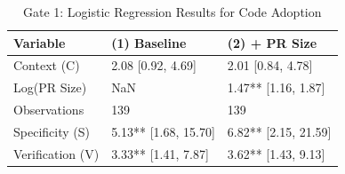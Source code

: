 \begin{table}
\caption{Gate 1: Logistic Regression Results for Code Adoption}
\label{tab:gate1}
\begin{tabular}{lll}
\toprule
Variable & (1) Baseline & (2) + PR Size \\
\midrule
Context (C) & 2.08 [0.92, 4.69] & 2.01 [0.84, 4.78] \\
Log(PR Size) & NaN & 1.47** [1.16, 1.87] \\
Observations & 139 & 139 \\
Specificity (S) & 5.13** [1.68, 15.70] & 6.82** [2.15, 21.59] \\
Verification (V) & 3.33** [1.41, 7.87] & 3.62** [1.43, 9.13] \\
\bottomrule
\end{tabular}
\end{table}
